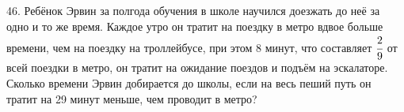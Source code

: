 46. Ребёнок Эрвин за полгода обучения в школе научился доезжать до неё за одно и то же время. Каждое утро он тратит на поездку в метро вдвое больше времени, чем на поездку на троллейбусе, при этом 8 минут, что составляет $\cfrac{2}{9}$ от всей поездки в метро, он тратит на ожидание поездов и подъём на эскалаторе. Сколько времени Эрвин добирается до школы, если на весь пеший путь он тратит на 29 минут меньше, чем проводит в метро?\\
